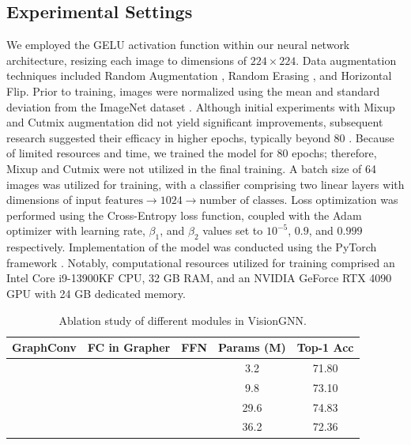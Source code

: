 \documentclass[sigconf, nonacm]{acmart}
\newcommand{\cmark}{\ding{51}}
\newcommand{\xmark}{\ding{55}}
\begin{document}
\subsection{Experimental Settings}
We employed the GELU activation function \cite{gelus} within our neural network architecture, resizing each image to dimensions of $224 \times 224$. Data augmentation techniques included Random Augmentation \cite{randaugment}, Random Erasing \cite{randerase}, and Horizontal Flip. Prior to training, images were normalized using the mean and standard deviation from the ImageNet dataset \cite{imagenet}. Although initial experiments with Mixup \cite{mixup} and Cutmix \cite{cutmix} augmentation did not yield significant improvements, subsequent research suggested their efficacy in higher epochs, typically beyond 80 \cite{mixup_without_hesitation, mixup_overtraining}. Because of limited resources and time, we trained the model for 80 epochs; therefore, Mixup and Cutmix were not utilized in the final training. A batch size of 64 images was utilized for training, with a classifier comprising two linear layers with dimensions of $\text{input features} \rightarrow 1024 \rightarrow \text{number of classes}$. Loss optimization was performed using the Cross-Entropy loss function, coupled with the Adam optimizer \cite{adamoptimizer} with learning rate, $\beta_1$, and $\beta_2$ values set to $10^{-5}$, $0.9$, and $0.999$ respectively. Implementation of the model was conducted using the PyTorch framework \cite{pytorch}. Notably, computational resources utilized for training comprised an Intel Core i9-13900KF CPU, 32 GB RAM, and an NVIDIA GeForce RTX 4090 GPU with 24 GB dedicated memory.

\begin{table}[b]
  \caption{Ablation study of different modules in VisionGNN.}
  \label{tab:abl_modules}
  \begin{tabular}{ccccc}
    \toprule
    GraphConv & FC in Grapher        & FFN        & Params (M) & Top-1 Acc      \\
    \midrule
    \cmark    & \xmark               & \xmark     & 3.2        & 71.80          \\
    \cmark    & \cmark               & \xmark     & 9.8        & 73.10          \\
    \cmark    & \xmark               & \cmark     & 29.6       & 74.83          \\
    \cmark    & \cmark               & \cmark     & 36.2       & 72.36          \\
    \bottomrule
  \end{tabular}
\end{table}
\end{document}

